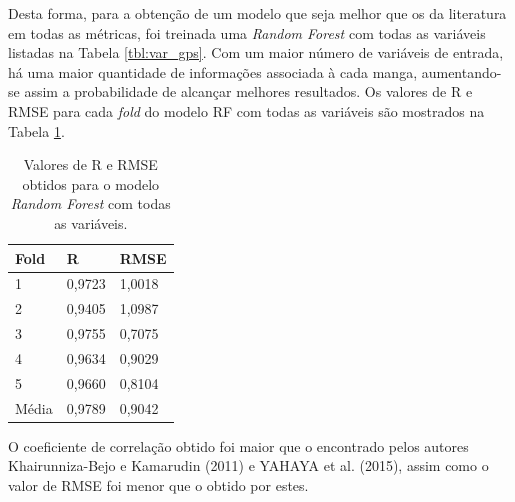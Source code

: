 Desta forma, para a obtenção de um modelo que seja melhor que os da literatura em todas as métricas, foi treinada uma \textit{Random Forest} com todas as variáveis listadas na Tabela \ref{tbl:var_gps}. Com um maior número de variáveis de entrada, há uma maior quantidade de informações associada à cada manga, aumentando-se assim a probabilidade de alcançar melhores resultados. Os valores de R e RMSE para cada \textit{fold} do modelo RF com todas as variáveis são mostrados na Tabela \ref{tbl:r_rmse_all}.

\begin{table}[H]
	\centering
	\caption{\label{tbl:r_rmse_all} Valores de R e RMSE obtidos para o modelo \textit{Random Forest} com todas as variáveis.}
	\begin{tabular}{lll}
	\hline
	Fold  & R      & RMSE   \\ \hline
	1     & 0,9723 & 1,0018 \\ \hline
	2     & 0,9405 & 1,0987 \\ \hline
	3     & 0,9755 & 0,7075 \\ \hline
	4     & 0,9634 & 0,9029 \\ \hline
	5     & 0,9660 & 0,8104 \\ \hline
	Média & 0,9789 & 0,9042	\\ \hline
	\end{tabular}
\end{table}

O coeficiente de correlação obtido foi maior que o encontrado pelos autores Khairunniza-Bejo e Kamarudin (2011) e YAHAYA et al. (2015), assim como o valor de RMSE foi menor que o obtido por estes.


 



